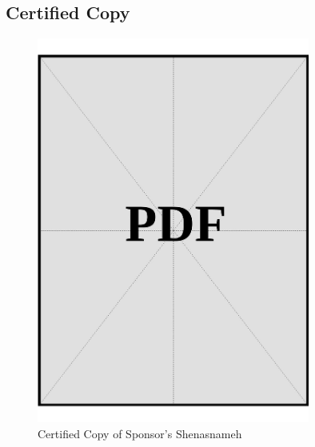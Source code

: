\subsection*{Certified Copy}
\vspace*{\fill}
\begin{figure}[h]
    \centering
    \includegraphics[page=1, width=0.8\textwidth]{../docs/sponsor/identification/shenasnameh/certified-copies.pdf}
    \caption{Certified Copy of Sponsor's Shenasnameh}
    \label{fig:sponsor-shenasnameh-certified-copy}
\end{figure}
\vspace*{\fill}
\clearpage
